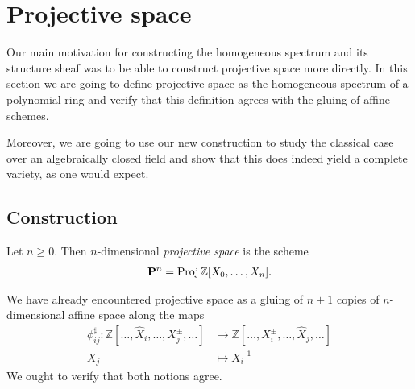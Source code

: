\documentclass{article}
\begin{document}
\section{Projective space}

Our main motivation for constructing the homogeneous spectrum and
its structure sheaf was to be able to construct projective space
more directly. In this section we are going to define projective space
as the homogeneous spectrum of a polynomial ring and verify that
this definition agrees with the gluing of affine schemes.

Moreover, we are going to use our new construction to study the
classical case over an algebraically closed field and show that this
does indeed yield a complete variety, as one would expect.

\subsection{Construction}

\begin{definition}
  Let $n\geq 0$. Then $n$-dimensional \emph{projective space}
  is the scheme
  \begin{align*}
    \mathbf{P}^{n}_{} = \operatorname{Proj} \mathbb{Z}[X_0,\ldots,X_n].
  \end{align*}
\end{definition}

We have already encountered projective space as a gluing of $n+1$
copies of $n$-dimensional affine space along the maps
\begin{align*}
  \phi^\sharp_{ij} :
  \mathbb{Z}[\ldots,\hat X_i,\ldots,X_j^\pm,\ldots]
  &\to \mathbb{Z}[\ldots,X_i^\pm,\ldots,\hat X_j,\ldots] \\
  X_j &\mapsto {X^{-1}_i}
\end{align*}
We ought to verify that both notions agree.
\end{document}
